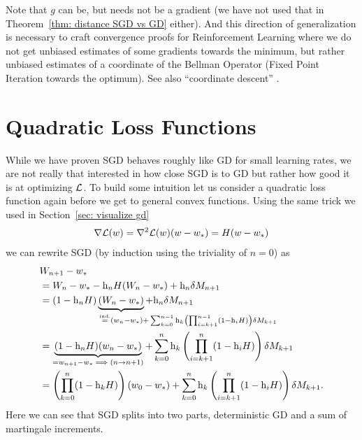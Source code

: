 Note that \(g\) can be, but needs not be a gradient (we have not used that in
Theorem~\ref{thm: distance SGD vs GD} either). And this direction of
generalization is necessary to craft convergence proofs for Reinforcement
Learning where we do not get unbiased estimates of some gradients towards the
minimum, but rather unbiased estimates of a coordinate of the Bellman Operator
(Fixed Point Iteration towards the optimum). See also ``coordinate descent''
\parencite[e.g.][Section~7.3]{bottouOptimizationMethodsLargeScale2018}.


\section{Quadratic Loss Functions}\label{sec: quadratic loss SGD}

While we have proven SGD behaves roughly like GD for small learning rates, we
are not really that interested in how close SGD is to GD but rather how good it
is at optimizing \(\mathcal{L}\). To build some intuition let us consider a
quadratic loss function again before we get to general convex functions.
Using the same trick we used in Section~\ref{sec: visualize gd} 
\begin{align*}
	\nabla\mathcal{L}(w)
	= \nabla^2\mathcal{L}(w)(w-w_*)
	= H(w-w_*)
\end{align*}
we can rewrite SGD (by induction using the triviality of \(n=0\)) as
\begin{align}
	\nonumber
	&\Weights_{n+1}-\minimum\\
	\nonumber
	&= \Weights_n - \minimum - \lr_n H(\Weights_n-\minimum) + \lr_n\martIncr_{n+1}\\
	\label{eq: recursive SGD formula in the quadratic case}
	&=(1-\lr_n H)\underbrace{(\Weights_n - \minimum)}_{
		\xeq{\text{ind.}} (\weights_n - \minimum)
		\mathrlap{+ \sum_{k=0}^{n-1}\lr_k\left(\prod_{i=k+1}^{n-1}(1-\lr_iH)\right)\martIncr_{k+1}}
	} + \lr_n\martIncr_{n+1}\\
	\nonumber
	&= \underbrace{(1-\lr_n H)(\weights_n - \minimum)}_{=\weights_{n+1}-\minimum \implies (n\to n+1)}
	+ \sum_{k=0}^n\lr_k\left(\prod_{i=k+1}^n(1-\lr_iH)\right)\martIncr_{k+1}\\
	\label{eq: unrolled SGD weights (general quadratic loss case)}
	&=\left(\prod_{k=0}^n(1-\lr_kH)\right)(\weights_0-\minimum)
	+ \sum_{k=0}^n\lr_k\left(\prod_{i=k+1}^n(1-\lr_iH)\right)\martIncr_{k+1}.
\end{align}
Here we can see that SGD splits into two parts, deterministic GD and a sum of
martingale increments.

